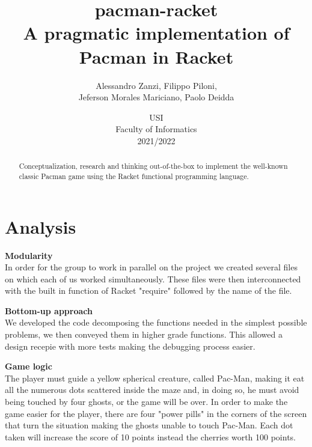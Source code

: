\documentclass{article}
\title{
\textbf{pacman-racket} \\
A pragmatic implementation of Pacman in Racket
}
\author{
    Alessandro Zanzi,
    Filippo Piloni,\\
    Jeferson Morales Mariciano,
    Paolo Deidda
}
\date{
USI \\
Faculty of Informatics \\
[\baselineskip]  2021/2022
}
\begin{document}
\begin{titlepage}
\maketitle

\end{titlepage}
 \begin{abstract}
Conceptualization, research and thinking out-of-the-box
to implement the well-known classic Pacman game
using the Racket functional programming language.
 \end{abstract}
\clearpage
 \tableofcontents
 \clearpage
 \section{Analysis}
 
 \hspace{0.5cm}\textbf{Modularity}\\
 In order for the group to work in parallel on the project we created several files on which each of us worked simultaneously. These files were then interconnected with the built in function of Racket "require" followed by the name of the file.
 
 
 
 \textbf{Bottom-up approach}\\
 We developed the code decomposing the functions needed in the simplest possible problems, we then conveyed them in higher grade functions. This allowed a design recepie with more tests making the debugging process easier.
 
 \textbf{Game logic}\\
The player must guide a yellow spherical creature, called Pac-Man, making it eat all the numerous dots scattered inside the maze and, in doing so, he must avoid being touched by four ghosts, or the game will be over. In order to make the game easier for the player, there are four "power pills" in the corners of the screen that turn the situation making the ghosts unable to touch Pac-Man. Each dot taken will increase the score of 10 points instead the cherries worth 100 points.

\end{document}
